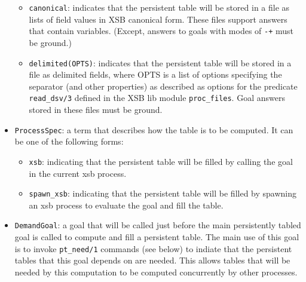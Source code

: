 \begin{itemize}
\begin{itemize}

\item{{\tt canonical}}: indicates that the persistent table will be
stored in a file as lists of field values in XSB canonical form.
These files support answers that contain variables.  (Except, answers
to goals with modes of {\tt -+} must be ground.)

\item{{\tt delimited(OPTS)}}: indicates that the persistent table will
be stored in a file as delimited fields, where OPTS is a list of
options specifying the separator (and other properties) as described
as options for the predicate {\tt read\_dsv/3} defined in the XSB lib
module {\tt proc\_files}.  Goal answers stored in these files must be
ground.

\end{itemize}

\item{{\tt ProcessSpec}}: a term that describes how the table is to
be computed.  It can be one of the following forms:

\begin{itemize}

\item{{\tt xsb}}: indicating that the persistent table will be filled by
calling the goal in the current xsb process.

\item{{\tt spawn\_xsb}}: indicating that the persistent table will be
filled by spawning an xsb process to evaluate the goal and fill the table.

\end{itemize}

\item{{\tt DemandGoal}}: a goal that will be called just before the
main persistently tabled goal is called to compute and fill a
persistent table.  The main use of this goal is to invoke
{\tt pt\_need/1} commands (see below) to indiate that
the persistent tables that this goal depends on are needed.  This
allows tables that will be needed by this computation to be computed
concurrently by other processes.  



\end{itemize}

